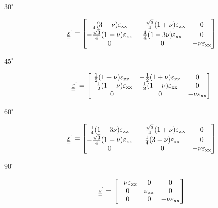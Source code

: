 \documentclass
[
a4paper,                      %
twoside,					  %
12pt,                         %
abstract,		      %
fleqn,                        %
]
{scrartcl} %
\begin{document}
\begin{enumerate}
\begin{itemize}
\begin{description}
\item [$30^{\circ}$]

\begin{equation}
\underline{\underline{\varepsilon}}^{`}=\begin{bmatrix}
 \frac{1}{4} (3-\nu ) \varepsilon _{\text{xx}} & -\frac{ \sqrt{3} }{4}(1+\nu ) \varepsilon _{\text{xx}} & 0 \\
 -\frac{ \sqrt{3} }{4}  (1+\nu ) \varepsilon _{\text{xx}} & \frac{1}{4} (1-3 \nu ) \varepsilon _{\text{xx}} & 0 \\
 0 & 0 & -\nu  \varepsilon _{\text{xx}} \\
\end{bmatrix}
\end{equation}

\item [$45^{\circ}$]


\begin{equation}
\underline{\underline{\varepsilon}}^{`}=\begin{bmatrix}
\frac{1}{2} (1-\nu ) \varepsilon _{\text{xx}} & -\frac{1}{2} (1+\nu ) \varepsilon _{\text{xx}} & 0 \\
 -\frac{1}{2} (1+\nu ) \varepsilon _{\text{xx}} & \frac{1}{2} (1-\nu ) \varepsilon _{\text{xx}} & 0 \\
 0 & 0 & -\nu  \varepsilon _{\text{xx}} \\
\end{bmatrix}
\end{equation}

\item [$60^{\circ}$]


\begin{equation}
\underline{\underline{\varepsilon}}^{`}=\begin{bmatrix}
\frac{1}{4} (1-3 \nu ) \varepsilon _{\text{xx}} & -\frac{ \sqrt{3}}{4} (1+\nu ) \varepsilon _{\text{xx}} & 0 \\
 -\frac{ \sqrt{3}}{4} (1+\nu ) \varepsilon _{\text{xx}} & \frac{1}{4} (3-\nu ) \varepsilon _{\text{xx}} & 0 \\
 0 & 0 & -\nu  \varepsilon _{\text{xx}} \\
\end{bmatrix}
\end{equation}

\item [$90^{\circ}$]
 
 
\begin{equation}
\underline{\underline{\varepsilon}}^{`}=\begin{bmatrix}
 -\nu  \varepsilon _{\text{xx}} & 0 & 0 \\
 0 & \varepsilon _{\text{xx}} & 0 \\
 0 & 0 & -\nu  \varepsilon _{\text{xx}} \\
\end{bmatrix}
\end{equation}


\end{description}
\end{itemize}
\end{enumerate}
\end{document}
